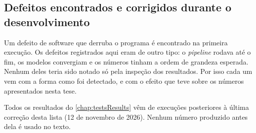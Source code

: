 \begin{apendicesenv}
	\chapter{Defeitos encontrados e corrigidos durante o desenvolvimento}
	\label{apend:defeitos}

		\par Um defeito de software que derruba o programa é encontrado na primeira
		execução. Os defeitos registrados aqui eram de outro tipo: o \textit{pipeline}
		rodava até o fim, os modelos convergiam e os números tinham a ordem de grandeza
		esperada. Nenhum deles teria sido notado só pela inspeção dos resultados. Por
		isso cada um vem com a forma como foi detectado, e com o efeito que teve sobre
		os números apresentados nesta tese.

		\par Todos os resultados do \autoref{chap:testsResults} vêm de execuções
		posteriores à última correção desta lista (12 de novembro de 2026). Nenhum
		número produzido antes dela é usado no texto.


\end{apendicesenv}

